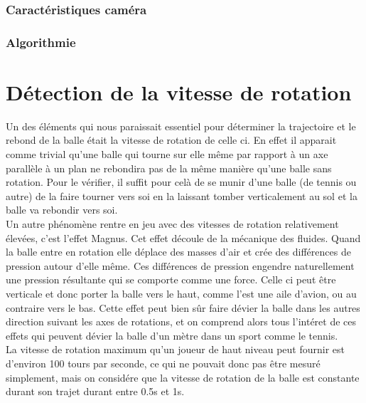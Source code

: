 \subsubsection{Caractéristiques caméra}



\subsubsection{Algorithmie}








\section{Détection de la vitesse de rotation}

Un des éléments qui nous paraissait essentiel pour déterminer la trajectoire et le rebond de la balle était la vitesse de rotation de celle ci. En effet il apparait comme trivial qu'une balle qui tourne sur elle même par rapport à un axe parallèle à un plan ne rebondira pas de la même manière qu'une balle sans rotation. Pour le vérifier, il suffit pour celà de se munir d'une balle (de tennis ou autre) de la faire tourner vers soi en la laissant tomber verticalement au sol et la balle va rebondir vers soi.\\

Un autre phénomène rentre en jeu avec des vitesses de rotation relativement élevées, c'est l'effet Magnus. Cet effet découle de la mécanique des fluides. Quand la balle entre en rotation elle déplace des masses d'air et crée des différences de pression autour d'elle même. Ces différences de pression engendre naturellement une pression résultante qui se comporte comme une force. Celle ci peut être verticale et donc porter la balle vers le haut, comme l'est une aile d'avion, ou au contraire vers le bas. Cette effet peut bien sûr faire dévier la balle dans les autres direction suivant les axes de rotations, et on comprend alors tous l'intéret de ces effets qui peuvent dévier la balle d'un mètre dans un sport comme le tennis.\\

La vitesse de rotation maximum qu'un joueur de haut niveau peut fournir est d'environ 100 tours par seconde, ce qui ne pouvait donc pas être mesuré simplement, mais on considére que la vitesse de rotation de la balle est constante durant son trajet durant entre 0.5s et 1s.

